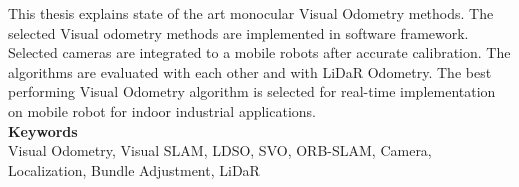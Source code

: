 \noindent
\normalsize
This thesis explains state of the art monocular Visual Odometry methods. The selected Visual odometry methods are implemented in software framework. Selected cameras are integrated to a mobile robots after accurate calibration. The algorithms are evaluated with each other and with LiDaR Odometry. The best performing Visual Odometry algorithm is selected for real-time implementation on mobile robot for indoor industrial applications.  \\


\vspace{13pt}
\noindent\huge\textbf{Keywords} \\
\vspace{13pt}
\normalsize
\newline
Visual Odometry, Visual SLAM, LDSO, SVO, ORB-SLAM, Camera, Localization, Bundle Adjustment, LiDaR